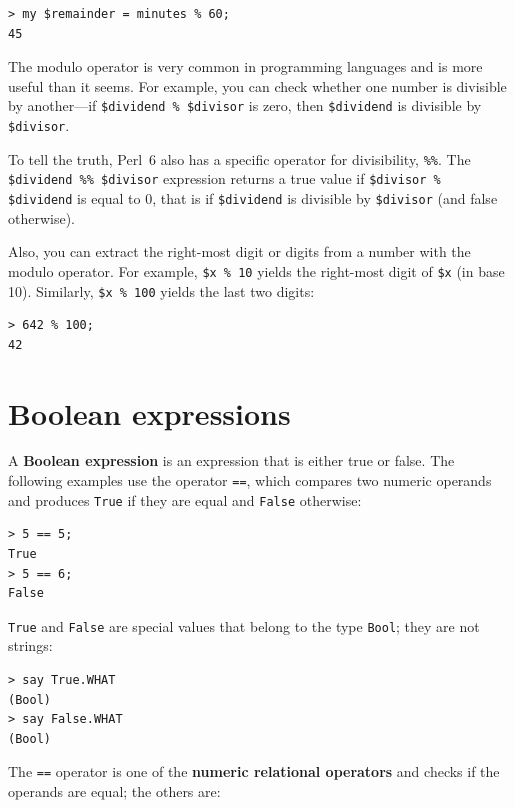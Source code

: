 \begin{verbatim}
> my $remainder = minutes % 60;
45
\end{verbatim}
%
The modulo operator is very common in programming languages
and is more useful than it seems.  For example, you can 
check whether one number is divisible by another---if 
{\tt \$dividend \% \$divisor} is zero, then {\tt \$dividend} 
is divisible by {\tt \$divisor}.

To tell the truth, Perl~6 also has a specific operator for 
divisibility, \verb"%%". The \verb'$dividend %% $divisor' 
expression returns a true value if
\verb'$divisor % $dividend' is equal to 0,  
that is if {\tt \$dividend} is divisible by {\tt \$divisor} (and false otherwise).

Also, you can extract the right-most digit
or digits from a number with the modulo operator.  For example, {\tt \$x \% 10} yields the
right-most digit of {\tt \$x} (in base 10).  Similarly, {\tt \$x \% 100}
yields the last two digits:

\begin{verbatim}
> 642 % 100;
42
\end{verbatim}
%



\section{Boolean expressions}

A {\bf Boolean expression} is an expression that is either true
or false.  The following examples use the operator {\tt ==}, 
which compares two numeric operands and produces
{\tt True} if they are equal and {\tt False} otherwise:

\begin{verbatim}
> 5 == 5;
True
> 5 == 6;
False
\end{verbatim}
%
{\tt True} and {\tt False} are special
values that belong to the type {\tt Bool}; they are not strings:

\begin{verbatim}
> say True.WHAT
(Bool)
> say False.WHAT
(Bool)
\end{verbatim}
%
The {\tt ==} operator is one of the {\bf numeric relational operators} 
and checks if the operands are equal; the others are:

